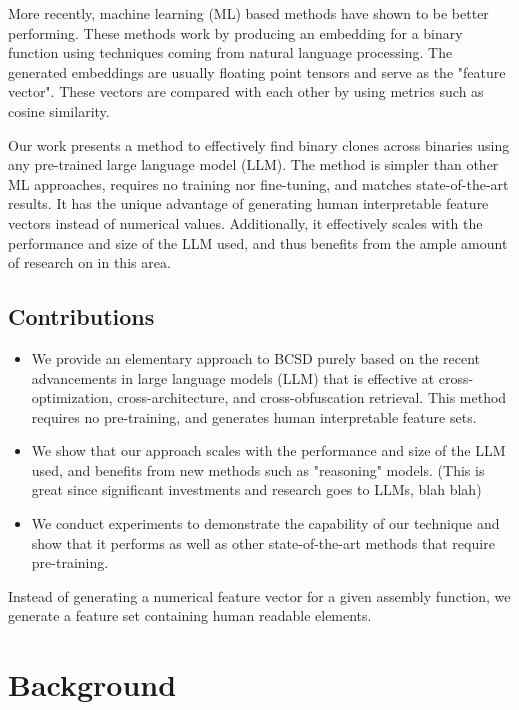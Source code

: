 \documentclass[conference,compsoc]{IEEEtran}
\begin{document}
More recently, machine learning (ML) based methods have shown to be better performing.
These methods work by producing an embedding for a binary function using techniques coming from natural language processing.
The generated embeddings are usually floating point tensors and serve as the "feature vector". These vectors are compared
with each other by using metrics such as cosine similarity.

Our work presents a method to effectively find binary clones across binaries using any pre-trained large language model (LLM).
The method is simpler than other ML approaches, requires no training nor fine-tuning, and matches state-of-the-art results.
It has the unique advantage of generating human interpretable feature vectors instead of numerical values. Additionally,
it effectively scales with the performance and size of the LLM used, and thus benefits from the ample amount of research
on in this area.

\subsection{Contributions}

\begin{itemize}
\item We provide an elementary approach to BCSD purely based on the recent advancements in large language models (LLM) that
    is effective at cross-optimization, cross-architecture, and cross-obfuscation retrieval. This method requires no
    pre-training, and generates human interpretable feature sets.
\item We show that our approach scales with the performance and size of the LLM used, and benefits from new
    methods such as "reasoning" models.  (This is great since significant investments and research goes to LLMs, blah blah)
\item We conduct experiments to demonstrate the capability of our technique and show that it performs as well as other state-of-the-art
    methods that require pre-training.
\end{itemize}

Instead of generating a numerical feature vector for a given assembly function, we generate a feature set containing
human readable elements.

\section{Background}
\end{document}
